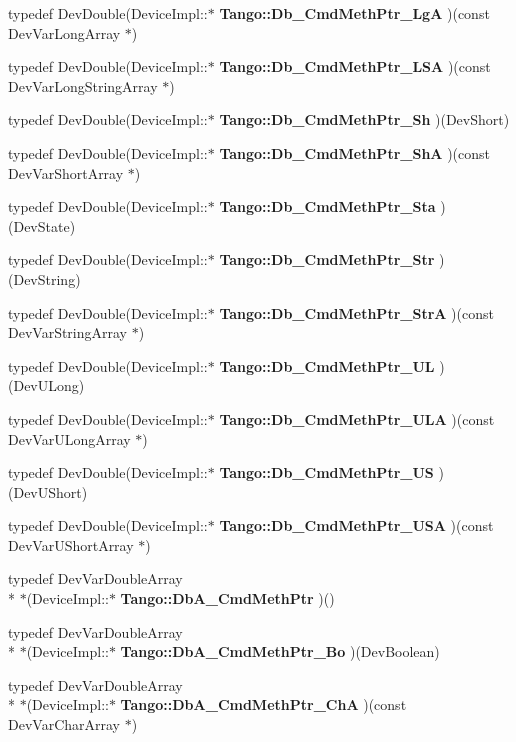 \begin{DoxyCompactItemize}
\item 
typedef Dev\-Double(Device\-Impl\-::$\ast$ {\bf Tango\-::\-Db\-\_\-\-Cmd\-Meth\-Ptr\-\_\-\-Lg\-A} )(const Dev\-Var\-Long\-Array $\ast$)
\item 
typedef Dev\-Double(Device\-Impl\-::$\ast$ {\bf Tango\-::\-Db\-\_\-\-Cmd\-Meth\-Ptr\-\_\-\-L\-S\-A} )(const Dev\-Var\-Long\-String\-Array $\ast$)
\item 
typedef Dev\-Double(Device\-Impl\-::$\ast$ {\bf Tango\-::\-Db\-\_\-\-Cmd\-Meth\-Ptr\-\_\-\-Sh} )(Dev\-Short)
\item 
typedef Dev\-Double(Device\-Impl\-::$\ast$ {\bf Tango\-::\-Db\-\_\-\-Cmd\-Meth\-Ptr\-\_\-\-Sh\-A} )(const Dev\-Var\-Short\-Array $\ast$)
\item 
typedef Dev\-Double(Device\-Impl\-::$\ast$ {\bf Tango\-::\-Db\-\_\-\-Cmd\-Meth\-Ptr\-\_\-\-Sta} )(Dev\-State)
\item 
typedef Dev\-Double(Device\-Impl\-::$\ast$ {\bf Tango\-::\-Db\-\_\-\-Cmd\-Meth\-Ptr\-\_\-\-Str} )(Dev\-String)
\item 
typedef Dev\-Double(Device\-Impl\-::$\ast$ {\bf Tango\-::\-Db\-\_\-\-Cmd\-Meth\-Ptr\-\_\-\-Str\-A} )(const Dev\-Var\-String\-Array $\ast$)
\item 
typedef Dev\-Double(Device\-Impl\-::$\ast$ {\bf Tango\-::\-Db\-\_\-\-Cmd\-Meth\-Ptr\-\_\-\-U\-L} )(Dev\-U\-Long)
\item 
typedef Dev\-Double(Device\-Impl\-::$\ast$ {\bf Tango\-::\-Db\-\_\-\-Cmd\-Meth\-Ptr\-\_\-\-U\-L\-A} )(const Dev\-Var\-U\-Long\-Array $\ast$)
\item 
typedef Dev\-Double(Device\-Impl\-::$\ast$ {\bf Tango\-::\-Db\-\_\-\-Cmd\-Meth\-Ptr\-\_\-\-U\-S} )(Dev\-U\-Short)
\item 
typedef Dev\-Double(Device\-Impl\-::$\ast$ {\bf Tango\-::\-Db\-\_\-\-Cmd\-Meth\-Ptr\-\_\-\-U\-S\-A} )(const Dev\-Var\-U\-Short\-Array $\ast$)
\item 
typedef Dev\-Var\-Double\-Array \\*
$\ast$(Device\-Impl\-::$\ast$ {\bf Tango\-::\-Db\-A\-\_\-\-Cmd\-Meth\-Ptr} )()
\item 
typedef Dev\-Var\-Double\-Array \\*
$\ast$(Device\-Impl\-::$\ast$ {\bf Tango\-::\-Db\-A\-\_\-\-Cmd\-Meth\-Ptr\-\_\-\-Bo} )(Dev\-Boolean)
\item 
typedef Dev\-Var\-Double\-Array \\*
$\ast$(Device\-Impl\-::$\ast$ {\bf Tango\-::\-Db\-A\-\_\-\-Cmd\-Meth\-Ptr\-\_\-\-Ch\-A} )(const Dev\-Var\-Char\-Array $\ast$)
\item 

\end{DoxyCompactItemize}
